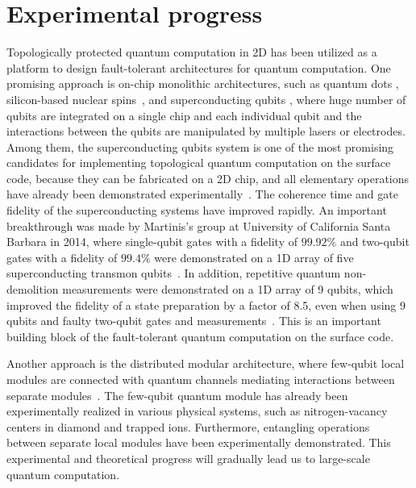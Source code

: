 \section{Experimental progress}
Topologically protected quantum computation in 2D has been utilized as a platform to design fault-tolerant architectures for quantum computation.
One promising approach is on-chip monolithic architectures, such as quantum dots \cite{VanMeter,Jones12}, silicon-based nuclear spins~\cite{SiliconSpin}, and superconducting qubits \cite{Fowler1,Fowler2,IBM13,IBM14}, where huge number of qubits are integrated on a single chip and each individual qubit and the interactions between the qubits are manipulated by multiple lasers or electrodes.
Among them, the superconducting qubits system is one of the most promising candidates for implementing topological quantum computation on the surface code, because they can be fabricated on a 2D chip, and all elementary operations have already been demonstrated experimentally~\cite{ChargeQubit,ChargeCNOT,FluxQubit,DispersiveMeas}.
The coherence time and gate fidelity of the superconducting systems have improved rapidly.
An important breakthrough was made by Martinis's group at University of California Santa Barbara in 2014, where single-qubit gates with a fidelity of $99.92\%$ and two-qubit gates with a fidelity of $99.4\%$ were demonstrated on a 1D array of five superconducting transmon qubits~\cite{MartinisLegend,QuantumQuest}.
In addition, repetitive quantum non-demolition measurements were demonstrated on a 1D array of 9 qubits, which improved the fidelity of a state preparation by a factor of 8.5, even when using 9 qubits and faulty two-qubit gates and measurements~\cite{Martinis9qubit}.
This is an important building block of the fault-tolerant quantum computation on the surface code.

Another approach is the distributed modular architecture, where few-qubit local modules are connected with quantum channels mediating interactions between separate modules~\cite{LiBenjamin,FTProb,FujiiDis,Benjamin1,Benjamin2,Monroe}.
The few-qubit quantum module has already been experimentally realized in various physical systems, such as nitrogen-vacancy centers in diamond and trapped ions.
Furthermore, entangling operations between separate local modules have been experimentally demonstrated.
This experimental and theoretical progress will gradually lead us to large-scale quantum computation.